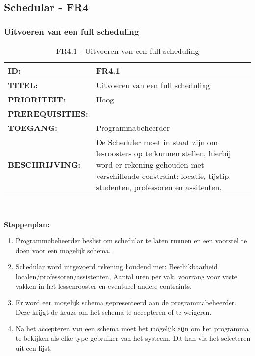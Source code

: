 \subsection{Schedular - FR4}

\subsubsection{Uitvoeren van een full scheduling}
\noindent\begin{table}[H]
            \begin{tabular}{l | p{10cm}}
                \textbf{ID:} & FR4.1 \\ \hline
                \textbf{TITEL:} & Uitvoeren van een full scheduling\\ \hline
                \textbf{PRIORITEIT:} &  Hoog \\ \hline
                \textbf{PREREQUISITIES:} & \\ \hline
                \textbf{TOEGANG:} & Programmabeheerder \\ \hline
                \textbf{BESCHRIJVING:} & De Scheduler moet in staat zijn om lesroosters op te kunnen stellen, hierbij word er rekening gehouden met verschillende constraint: locatie, tijstip, studenten, professoren en assitenten. \\
            \end{tabular}\\
            \caption{FR4.1 - Uitvoeren van een full scheduling}
            \label{tab:FR4.1 - Uitvoeren van een full scheduling}
        \end{table}
      
\textbf{Stappenplan:}
	\begin{enumerate}
	\item Programmabeheerder beslist om schedular te laten runnen en een voorstel te doen voor een mogelijk schema.
	\item Schedular word uitgevoerd rekening houdend met: Beschikbaarheid localen/professoren/assistenten, Aantal uren per vak, voorrang voor vaste vakken in het lessenrooster en eventueel andere contraints.
	\item Er word een mogelijk schema gepresenteerd aan de programmabeheerder. Deze krijgt de keuze om het schema te accepteren of te weigeren.
	\item Na het accepteren van een schema moet het mogelijk zijn om het programma te bekijken als elke type gebruiker van het systeem. Dit kan via het selecteren uit een lijst.
	\end{enumerate}

